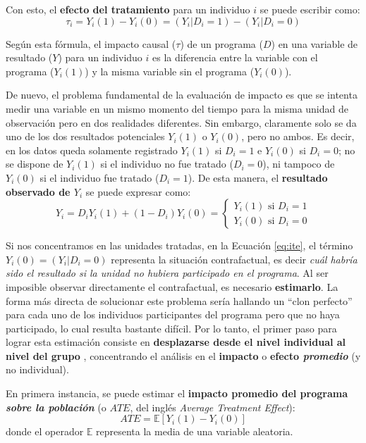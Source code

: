 \documentclass[../../main.tex]{subfiles}
\begin{document}
Con esto, el \textbf{efecto del tratamiento} para un individuo \(i\) se puede escribir como:
\begin{equation}
    \tau_i = Y_i(1) - Y_i(0) = (Y_i|D_i=1) - (Y_i|D_i=0)
    \label{eq:ite} %
\end{equation}

Según esta fórmula, el impacto causal (\(\tau\)) de un programa (\(D\)) en una variable de resultado (\(Y\)) para un individuo \(i\) es la diferencia entre la variable con el programa (\(Y_i(1)\)) y la misma variable sin el programa (\(Y_i(0)\)). 

De nuevo, el problema fundamental de la evaluación de impacto es que se intenta medir una variable en un mismo momento del tiempo para la misma unidad de observación pero en dos realidades diferentes. Sin embargo, claramente solo se da uno de los dos resultados potenciales \(Y_i(1)\) o \(Y_i(0)\), pero no ambos. Es decir, en los datos queda solamente registrado \(Y_i(1)\) si \(D_i=1\) e \(Y_i(0)\) si \(D_i=0\); no se dispone de \(Y_i(1)\) si el individuo no fue tratado (\(D_i=0\)), ni tampoco de \(Y_i(0)\) si el individuo fue tratado (\(D_i=1\)). De esta manera, el \textbf{resultado observado de \(Y_i\)} se puede expresar como:
\begin{equation}
    Y_i = D_i Y_i(1) + (1-D_i)Y_i(0) =
    \begin{cases}
        Y_i(1) \text{ si } D_i=1 \\
        Y_i(0) \text{ si } D_i=0
    \end{cases}
    \label{eq:observed-result}
\end{equation}

Si nos concentramos en las unidades tratadas, en la Ecuación \ref{eq:ite}, el término \(Y_i(0) = (Y_i|D_i=0)\) representa la situación contrafactual, es decir \textit{cuál habría sido el resultado si la unidad no hubiera participado en el programa}. Al ser imposible observar directamente el contrafactual, es necesario \textbf{estimarlo}. La forma más directa de solucionar este problema sería hallando un ``clon perfecto'' para cada uno de los individuos participantes del programa pero que no haya participado, lo cual resulta bastante difícil. Por lo tanto, el primer paso para lograr esta estimación consiste en \textbf{desplazarse desde el nivel individual al nivel del grupo} \cite{gertler-2016}, concentrando el análisis en el \textbf{impacto} o \textbf{efecto \textit{promedio}} (y no individual).

En primera instancia, se puede estimar el \textbf{impacto promedio del programa \textit{sobre la población}} (o \(ATE\), del inglés \textit{Average Treatment Effect}):
\begin{equation}
    ATE = \mathbb{E}\left[Y_i(1)-Y_i(0)\right]
\end{equation}
donde el operador \(\mathbb{E}\) representa la media de una variable aleatoria.
\end{document}
